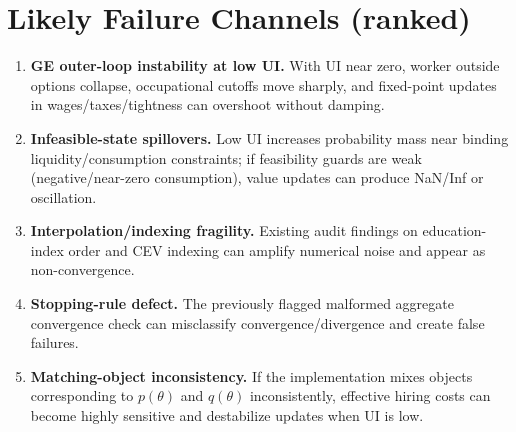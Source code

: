 \documentclass[11pt]{article}
\begin{document}
\section*{Likely Failure Channels (ranked)}
\begin{enumerate}
\item \textbf{GE outer-loop instability at low UI.} With UI near zero, worker outside options collapse, occupational cutoffs move sharply, and fixed-point updates in wages/taxes/tightness can overshoot without damping.
\item \textbf{Infeasible-state spillovers.} Low UI increases probability mass near binding liquidity/consumption constraints; if feasibility guards are weak (negative/near-zero consumption), value updates can produce NaN/Inf or oscillation.
\item \textbf{Interpolation/indexing fragility.} Existing audit findings on education-index order and CEV indexing can amplify numerical noise and appear as non-convergence.
\item \textbf{Stopping-rule defect.} The previously flagged malformed aggregate convergence check can misclassify convergence/divergence and create false failures.
\item \textbf{Matching-object inconsistency.} If the implementation mixes objects corresponding to $p(\theta)$ and $q(\theta)$ inconsistently, effective hiring costs can become highly sensitive and destabilize updates when UI is low.
\end{enumerate}
\end{document}
